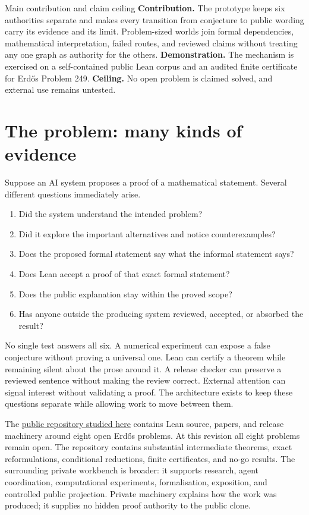 \documentclass[10pt]{article}
\newcommand{\repobase}{https://github.com/wcook04/plectis-lean-erdos249-257}
\begin{document}
\begin{paperresult}{Main contribution and claim ceiling}
\textbf{Contribution.} The prototype keeps six authorities separate and
makes every transition from conjecture to public wording carry its evidence
and its limit.  Problem-sized worlds join formal dependencies, mathematical
interpretation, failed routes, and reviewed claims without treating any one
graph as authority for the others.  \textbf{Demonstration.} The mechanism is
exercised on a self-contained public Lean corpus and an audited finite
certificate for Erd\H{o}s Problem 249.  \textbf{Ceiling.} No open problem is
claimed solved, and external use remains untested.
\end{paperresult}

\section{The problem: many kinds of evidence}

Suppose an AI system proposes a proof of a mathematical statement. Several
different questions immediately arise.

\begin{enumerate}
\item Did the system understand the intended problem?
\item Did it explore the important alternatives and notice counterexamples?
\item Does the proposed formal statement say what the informal statement says?
\item Does Lean accept a proof of that exact formal statement?
\item Does the public explanation stay within the proved scope?
\item Has anyone outside the producing system reviewed, accepted, or absorbed
      the result?
\end{enumerate}

No single test answers all six. A numerical experiment can expose a false
conjecture without proving a universal one. Lean can certify a theorem while
remaining silent about the prose around it. A release checker can preserve a
reviewed sentence without making the review correct. External attention can
signal interest without validating a proof. The architecture exists to keep
these questions separate while allowing work to move between them.

The \href{\repobase}{public repository studied here} contains Lean source,
papers, and release machinery around eight open Erd\H{o}s problems. At this
revision all eight problems remain open. The repository contains substantial
intermediate theorems, exact reformulations, conditional reductions, finite
certificates, and no-go results. The surrounding private workbench is broader:
it supports research, agent coordination, computational experiments,
formalisation, exposition, and controlled public projection. Private machinery
explains how the work was produced; it supplies no hidden proof authority to
the public clone.
\end{document}
